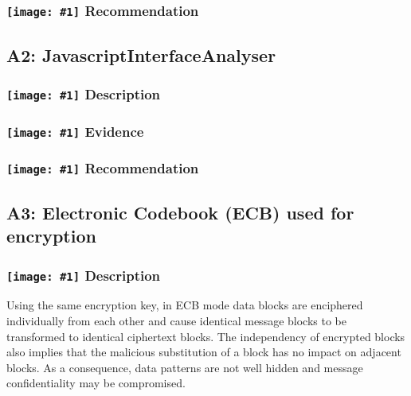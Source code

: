 \documentclass[12p]{article}
\newcommand{\icon}[1]{\texttt{[image: \#1]}}
\begin{document}
\subsubsection*{\protect\icon{/home/miki/Documents/GITHUB/AndroidPermissions/python/vulns/report_icons/basic_todo.png} Recommendation}

\subsection{A2: JavascriptInterfaceAnalyser}
\subsubsection*{\protect\icon{/home/miki/Documents/GITHUB/AndroidPermissions/python/vulns/report_icons/basic_sheet.png} Description}

\subsubsection*{\protect\icon{/home/miki/Documents/GITHUB/AndroidPermissions/python/vulns/report_icons/basic_magnifier.png} Evidence}

\subsubsection*{\protect\icon{/home/miki/Documents/GITHUB/AndroidPermissions/python/vulns/report_icons/basic_todo.png} Recommendation}

\subsection{A3: Electronic Codebook (ECB) used for encryption}
\subsubsection*{\protect\icon{/home/miki/Documents/GITHUB/AndroidPermissions/python/vulns/report_icons/basic_sheet.png} Description}

            Using the same encryption key, in ECB mode data blocks are enciphered individually 
            from each other and cause identical message blocks to be transformed to identical ciphertext 
            blocks. The independency of encrypted blocks also implies that the malicious substitution of a 
            block has no impact on adjacent blocks. As a consequence, data patterns are not well hidden and 
            message confidentiality may be compromised.
            
\end{document}

